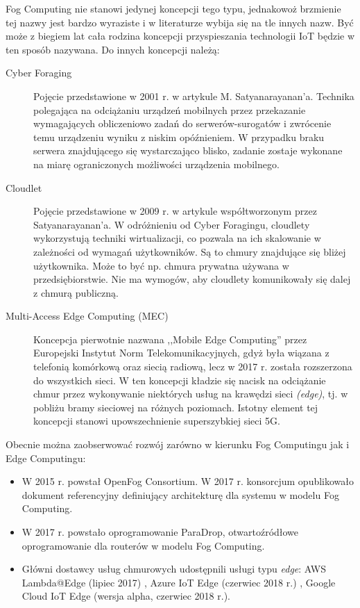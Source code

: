 \documentclass[12pt,a4paper,twoside,titlepage,openright]{book}
\begin{document}
Fog Computing nie stanowi jedynej koncepcji tego typu, jednakowoż brzmienie tej nazwy jest bardzo wyraziste i w literaturze wybija się na tle innych nazw. Być może z biegiem lat cała rodzina koncepcji przyspieszania technologii IoT będzie w ten sposób nazywana. Do innych koncepcji należą:
\begin{description}
\item [Cyber Foraging] Pojęcie przedstawione w 2001 r. w artykule M. Satyanarayanan'a. Technika polegająca na odciążaniu urządzeń mobilnych przez przekazanie wymagających obliczeniowo zadań do serwerów-surogatów i zwrócenie temu urządzeniu wyniku z niskim opóźnieniem. W przypadku braku serwera znajdującego się wystarczająco blisko, zadanie zostaje wykonane na miarę ograniczonych możliwości urządzenia mobilnego. \cite{fogArticle, fog5g}
\item [Cloudlet] Pojęcie przedstawione w 2009 r. w artykule współtworzonym przez Satyanarayanan'a. W odróżnieniu od Cyber Foragingu, cloudlety wykorzystują techniki wirtualizacji, co pozwala na ich skalowanie w zależności od wymagań użytkowników. Są to chmury znajdujące się bliżej użytkownika. Może to być np. chmura prywatna używana w przedsiębiorstwie. Nie ma wymogów, aby cloudlety komunikowały się dalej z chmurą publiczną. \cite{fogArticle, fog5g}
\item [Multi-Access Edge Computing (MEC)] Koncepcja pierwotnie nazwana ,,Mobile Edge Computing'' przez Europejski Instytut Norm Telekomunikacyjnych, gdyż była wiązana z telefonią komórkową oraz siecią radiową, lecz w 2017 r. została rozszerzona do wszystkich sieci. W ten koncepcji kładzie się nacisk na odciążanie chmur przez wykonywanie niektórych usług na krawędzi sieci \textit{(edge)}, tj. w pobliżu bramy sieciowej na różnych poziomach. Istotny element tej koncepcji stanowi upowszechnienie superszybkiej sieci 5G. \cite{fogArticle, fog5g}
\end{description}

Obecnie można zaobserwować rozwój zarówno w kierunku Fog Computingu jak i Edge Computingu:
\begin{itemize}
\item W 2015 r. powstał OpenFog Consortium. W 2017 r. konsorcjum opublikowało dokument referencyjny definiujący architekturę dla systemu w modelu Fog Computing. \cite{fogArticle, iotArchitects}
\item W 2017 r. powstało oprogramowanie ParaDrop, otwartoźródłowe oprogramowanie dla routerów w modelu Fog Computing. \cite{fog5g}
\item Główni dostawcy usług chmurowych udostępnili usługi typu \textit{edge}: AWS Lambda@Edge (lipiec 2017) \cite{siteAmazonLambdaEdge}, Azure IoT Edge (czerwiec 2018 r.) \cite{siteAzureIotEdge}, Google Cloud IoT Edge (wersja alpha, czerwiec 2018 r.)\cite{siteGoogleIotEdge}. 
\end{itemize}
\end{document}
